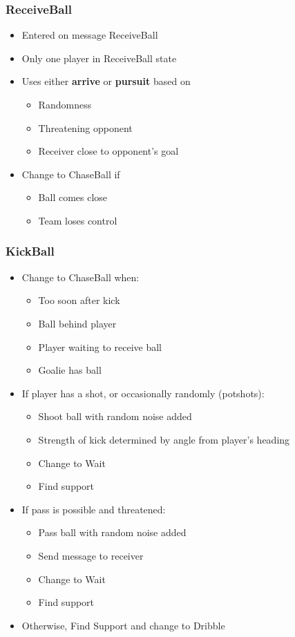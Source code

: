 \documentclass[handout,t,compress]{beamer}
\newcommand{\bframe}[1]{\begin{frame}[fragile]\frametitle{#1}}
\begin{document}
\bframe{ReceiveBall}
\begin{itemize}
\item Entered on message ReceiveBall
\item Only one player in ReceiveBall state
\item Uses either {\bf arrive} or {\bf pursuit} based on
\begin{itemize}
\item Randomness
\item Threatening opponent
\item Receiver close to opponent's goal
\end{itemize}
\item Change to ChaseBall if
\begin{itemize}
\item Ball comes close
\item Team loses control
\end{itemize}
\end{itemize}
\end{frame}

\bframe{KickBall}
\begin{itemize}
\item Change to ChaseBall when:
\begin{itemize}
\item Too soon after kick
\item Ball behind player
\item Player waiting to receive ball
\item Goalie has ball
\end{itemize}
\item If player has a shot, or occasionally randomly (potshots):
\begin{itemize}
\item Shoot ball with random noise added
\item Strength of kick determined by angle from player's heading
\item Change to Wait
\item Find support
\end{itemize}
\item If pass is possible and threatened:
\begin{itemize}
\item Pass ball with random noise added
\item Send message to receiver
\item Change to Wait
\item Find support
\end{itemize}
\item Otherwise, Find Support and change to Dribble
\end{itemize}
\end{frame}
\end{document}
